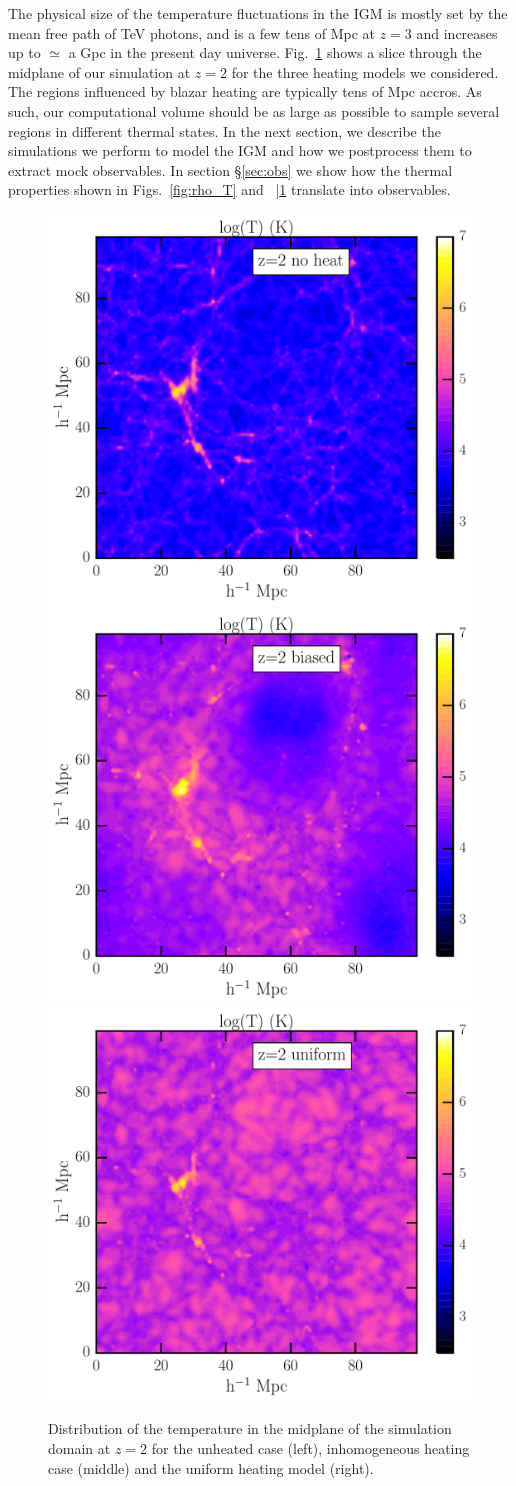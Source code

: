 \documentclass[numberedappendix]{emulateapj}
\newcommand\ALc[1]{{\color{red} \bf #1}} %
\begin{document}
The physical size of the temperature fluctuations in the IGM is mostly set by the mean free path of TeV photons, and is a few tens of Mpc at $z=3$ and increases up to $\simeq$ a Gpc in the present day universe. Fig.~\ref{fig:T_flucs} shows a slice through the midplane of our simulation at $z=2$ for the three heating models we considered.  The regions influenced by blazar heating are typically tens of Mpc accros. As such, our computational volume should be as large as possible to sample several regions in different thermal states. In the next section, we describe the simulations we perform to model the IGM and how we postprocess them to extract mock observables. In section \S\ref{sec:obs} we show how the thermal properties shown in Figs.~\ref{fig:rho_T} and ~|\ref{fig:T_flucs} translate into observables.

\begin{figure}
\centering
\includegraphics[width = .3\textwidth ]{T_map_z2_noheat.pdf}
\includegraphics[width = .3\textwidth ]{T_map_z2_qso.pdf}
\includegraphics[width = .3\textwidth ]{T_map_z2_uniform.pdf}
\caption{Distribution of the temperature in the midplane of the simulation domain at $z=2$ for the unheated case (left), inhomogeneous heating case (middle) and the uniform heating model (right).}
\label{fig:T_flucs}
\end{figure}
\end{document}
